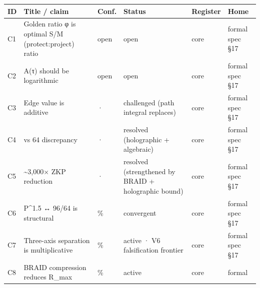\documentclass[
  11pt,
]{article}
\newcounter{none} %
\begin{document}
{\def\LTcaptype{none} %
\begin{longtable}[]{@{}
  >{\raggedright\arraybackslash}p{}
  >{\raggedright\arraybackslash}p{}
  >{\raggedright\arraybackslash}p{}
  >{\raggedright\arraybackslash}p{}
  >{\raggedright\arraybackslash}p{}
  >{\raggedright\arraybackslash}p{}@{}}
\toprule\noalign{}
\begin{minipage}[b]{\linewidth}\raggedright
ID
\end{minipage} & \begin{minipage}[b]{\linewidth}\raggedright
Title / claim
\end{minipage} & \begin{minipage}[b]{\linewidth}\raggedright
Conf.
\end{minipage} & \begin{minipage}[b]{\linewidth}\raggedright
Status
\end{minipage} & \begin{minipage}[b]{\linewidth}\raggedright
Register
\end{minipage} & \begin{minipage}[b]{\linewidth}\raggedright
Home
\end{minipage} \\
\midrule\noalign{}
\endhead
\bottomrule\noalign{}
\endlastfoot
C1 & Golden ratio φ is optimal S/M (protect:project) ratio & open & open
& core & formal spec §17 \\
C2 & A(τ) should be logarithmic & open & open & core & formal spec
§17 \\
C3 & Edge value is additive & · & challenged (path integral replaces) &
core & formal spec §17 \\
C4 & 96 vs 64 discrepancy & · & resolved (holographic + algebraic) &
core & formal spec §17 \\
C5 & \textasciitilde3,000× ZKP reduction & · & resolved (strengthened by
BRAID + holographic bound) & core & formal spec §17 \\
C6 & P\^{}1.5 ↔ 96/64 is structural & 35\% & convergent & core & formal
spec §17 \\
C7 & Three-axis separation is multiplicative & 30\% & active · V6
falsification frontier & core & formal spec §17 \\
C8 & BRAID compression reduces R\_max & 45\% & active & core & formal

\end{longtable}}
\end{document}
